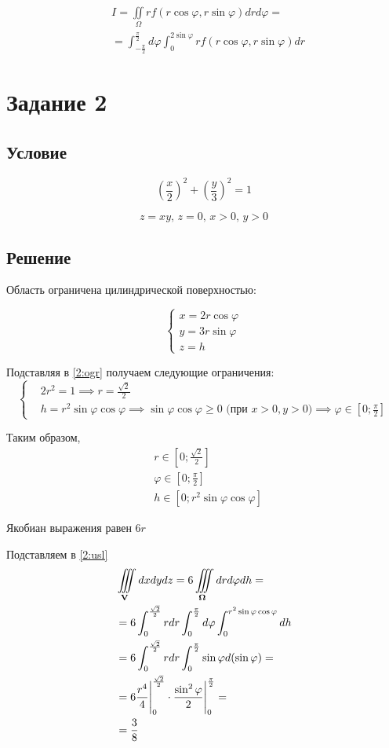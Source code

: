 \documentclass{report}
\newcommand*\task[1]{
       \chapter{#1}
       \section{Условие}
}
\newcommand*\tripleint[2]{\iiint\limits_{#1}#2}
\newcommand*\coordchthree[3]{
       \begin{cases}
              x = #1\\
              y = #2\\
              z = #3
       \end{cases}
}
\begin{document}
\begin{align*}
     & I = \iint\limits_{\Omega} r f(r \cos \varphi, r \sin \varphi)dr d \varphi =                                       \\
     & = \int_{-\frac{\pi}{2}}^{\frac{\pi}{2}} d \varphi \int_{0}^{2 \sin \varphi} r f(r \cos \varphi, r \sin \varphi)dr
\end{align*}

\task{Задание 2}

\begin{equation}
    \label{2:usl}
    \left( \frac{x}{2} \right)^2 + \left( \frac{y}{3} \right)^2 = 1
\end{equation}

\begin{equation}
    \label{2:ogr}
    z = xy \mbox{, } z = 0 \mbox{, } x > 0 \mbox{, } y > 0
\end{equation}

\section{Решение}

Область ограничена цилиндрической поверхностью:

$$
    \coordchthree{2 r \cos \varphi}{3 r \sin \varphi}{h}
$$

Подставляя в \ref{2:ogr} получаем следующие ограничения:
$$
    \begin{cases}
         & 2 r^2 = 1 \implies r = \frac{\sqrt{2}}{2}                                                                                                       \\
         & h = r^2 \sin \varphi \cos \varphi \implies \sin \varphi \cos \varphi \geq 0 \mbox{ (при } x > 0, y > 0) \implies \varphi \in [0; \frac{\pi}{2}]
    \end{cases}
$$

Таким образом,
\begin{align*}
     & r \in \left[ 0;\frac{\sqrt{2}}{2} \right]           \\
     & \varphi \in \left[0;\frac{\pi}{2}\right]            \\
     & h \in \left[0; r^2 \sin \varphi \cos \varphi\right]
\end{align*}

Якобиан выражения равен $6r$


Подставляем в \ref{2:usl}
\begin{align*}
     & \tripleint{{\bf{V}}}{dx dy dz} = 6 \tripleint{{\bf{\Omega}}}{dr d \varphi dh} =                                       \\
     & = 6 \int_{0}^{\frac{\sqrt{2}}{2}} r dr \int_{0}^{\frac{\pi}{2}} d \varphi \int_{0}^{r^2 \sin \varphi \cos \varphi} dh \\
     & = 6 \int_{0}^{\frac{\sqrt{2}}{2}} r dr \int_{0}^{\frac{\pi}{2}} \sin \varphi d (\sin \varphi) =                       \\
     & = 6 \frac{r^4}{4} \Biggr|_{0}^{\frac{\sqrt{2}}{2}} \cdot \frac{\sin^2 \varphi}{2} \Biggr|_{0}^{\frac{\pi}{2}} =       \\
     & = \frac{3}{8}
\end{align*}
\end{document}
